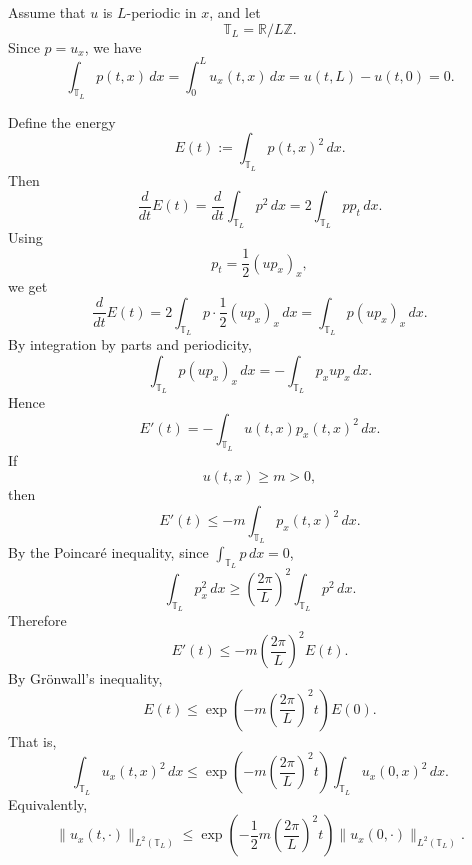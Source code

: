 Assume that \(u\) is \(L\)-periodic in \(x\), and let
\[
\mathbb T_L=\mathbb R/L\mathbb Z.
\]
Since \(p=u_x\), we have
\[
\int_{\mathbb T_L} p(t,x)\,dx
=
\int_0^L u_x(t,x)\,dx
=
u(t,L)-u(t,0)
=
0.
\]

Define the energy
\[
E(t):=\int_{\mathbb T_L} p(t,x)^2\,dx.
\]
Then
\[
\frac{d}{dt}E(t)
=
\frac{d}{dt}\int_{\mathbb T_L}p^2\,dx
=
2\int_{\mathbb T_L}p p_t\,dx.
\]
Using
\[
p_t=\frac12 (u p_x)_x,
\]
we get
\[
\frac{d}{dt}E(t)
=
2\int_{\mathbb T_L}p\cdot \frac12 (u p_x)_x\,dx
=
\int_{\mathbb T_L}p (u p_x)_x\,dx.
\]
By integration by parts and periodicity,
\[
\int_{\mathbb T_L}p (u p_x)_x\,dx
=
-\int_{\mathbb T_L}p_x u p_x\,dx.
\]
Hence
\[
\boxed{
E'(t)
=
-\int_{\mathbb T_L}u(t,x)p_x(t,x)^2\,dx.
}
\]
If
\[
u(t,x)\ge m>0,
\]
then
\[
E'(t)
\le
-m\int_{\mathbb T_L}p_x(t,x)^2\,dx.
\]
By the Poincaré inequality, since \(\int_{\mathbb T_L}p\,dx=0\),
\[
\int_{\mathbb T_L}p_x^2\,dx
\ge
\left(\frac{2\pi}{L}\right)^2
\int_{\mathbb T_L}p^2\,dx.
\]
Therefore
\[
E'(t)
\le
-m\left(\frac{2\pi}{L}\right)^2E(t).
\]
By Grönwall's inequality,
\[
\boxed{
E(t)
\le
\exp\left(
-m\left(\frac{2\pi}{L}\right)^2t
\right)E(0).
}
\]
That is,
\[
\boxed{
\int_{\mathbb T_L}u_x(t,x)^2\,dx
\le
\exp\left(
-m\left(\frac{2\pi}{L}\right)^2t
\right)
\int_{\mathbb T_L}u_x(0,x)^2\,dx.
}
\]
Equivalently,
\[
\boxed{
\|u_x(t,\cdot)\|_{L^2(\mathbb T_L)}
\le
\exp\left(
-\frac12 m\left(\frac{2\pi}{L}\right)^2t
\right)
\|u_x(0,\cdot)\|_{L^2(\mathbb T_L)}.
}
\]